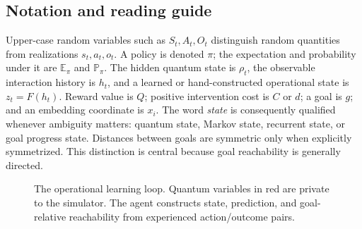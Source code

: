 \documentclass[11pt]{article}
\newcommand{\E}{\mathbb E}
\newcommand{\Prob}{\mathbb P}
\begin{document}
\subsection*{Notation and reading guide}

Upper-case random variables such as $S_t,A_t,O_t$ distinguish random
quantities from realizations $s_t,a_t,o_t$. A policy is denoted $\pi$; the
expectation and probability under it are $\E_\pi$ and $\Prob_\pi$. The hidden
quantum state is $\rho_t$, the observable interaction history is $h_t$, and a
learned or hand-constructed operational state is $z_t=F(h_t)$. Reward value is
$Q$; positive intervention cost is $C$ or $d$; a goal is $g$; and an embedding
coordinate is $x_i$. The word \emph{state} is consequently qualified whenever
ambiguity matters: quantum state, Markov state, recurrent state, or goal
progress state. Distances between goals are symmetric only when explicitly
symmetrized. This distinction is central because goal reachability is generally
directed.

\begin{figure}[t]
\centering
{}
\caption{The operational learning loop. Quantum variables in red are private
to the simulator. The agent constructs state, prediction, and goal-relative
reachability from experienced action/outcome pairs.}
\label{fig:loop}
\end{figure}
\end{document}
